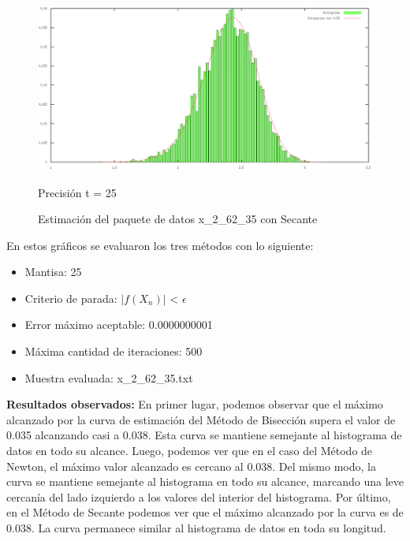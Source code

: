 \documentclass[10pt, a4paper]{article}
\begin{document}
\begin{figure}[H] %
\begin{center}
\includegraphics[width=370pt]{./Secante_25.png}
\caption[h]{Estimaci\'on del paquete de datos x\_2\_62\_35 con Secante}{Precisi\'on t = 25}
\end{center}
\end{figure}

En estos gr\'aficos se evaluaron los tres m\'etodos con lo siguiente:
\begin{itemize}
\item Mantisa: 25
\item Criterio de parada: $|f(X_{n})|$ < $\epsilon$ 
\item Error m\'aximo aceptable: 0.0000000001
\item M\'axima cantidad de iteraciones: 500
\item Muestra evaluada: x\_2\_62\_35.txt
\end{itemize}

\large{\textbf{Resultados observados:}} En primer lugar, podemos observar que el m\'aximo alcanzado por la curva de estimaci\'on del M\'etodo de Bisecci\'on supera el valor de 0.035 alcanzando casi a 0.038. Esta curva se mantiene semejante al histograma de datos en todo su alcance. Luego, podemos ver que en el caso del M\'etodo de Newton, el m\'aximo valor alcanzado es cercano al 0.038. Del mismo modo, la curva se mantiene semejante al histograma en todo su alcance, marcando una leve cercan\'ia del lado izquierdo a los valores del interior del histograma. Por \'ultimo, en el M\'etodo de Secante podemos ver que el m\'aximo alcanzado por la curva es de 0.038. La curva permanece similar al histograma de datos en toda su longitud.\newline
\end{document}
